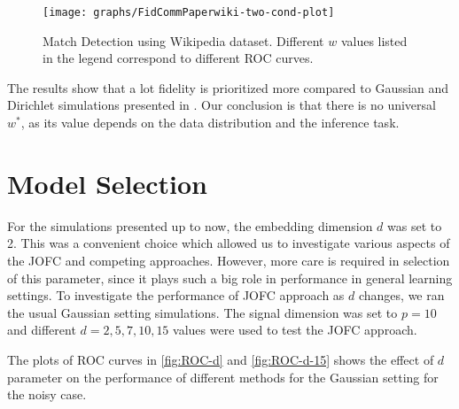 \documentclass[12pt,oneside,final]{thesis}
\begin{document}
\begin{figure}
 \centering
\texttt{[image: graphs/FidCommPaperwiki-two-cond-plot]}
\caption{Match Detection using Wikipedia dataset. Different $w$ values listed in the legend correspond to different ROC curves.}
\end{figure}

The results show that a lot fidelity is prioritized more compared to Gaussian and Dirichlet simulations presented in \label{sec:Simulation Results}. Our conclusion is that there is no universal $w^*$, as its value depends on the data distribution and the inference task.


\section{Model Selection}
For the simulations presented up to now, the embedding dimension $d$ was set to 2. This was a convenient choice which allowed us to investigate various aspects of the JOFC and competing approaches.
However,  more care is required in selection of this parameter, since it plays such a big role in performance in general learning settings. To investigate the performance of JOFC approach as $d$ changes, we ran the usual Gaussian setting simulations. The signal dimension was set to $p=10$ and different $d=2,5,7,10,15$ values were used to test the JOFC approach.

The  plots of ROC curves in    \ref{fig:ROC-d} and  \ref{fig:ROC-d-15} shows the effect of $d$ parameter on the performance of different methods for the Gaussian setting for the noisy case.
\end{document}
